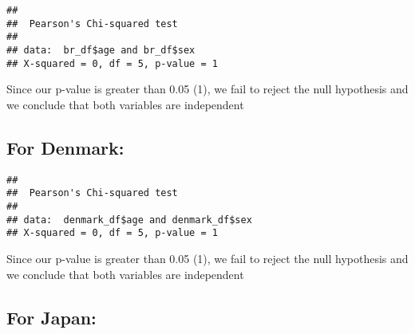 \documentclass[
]{article}
\newenvironment{Shaded}{\begin{snugshade}}{\end{snugshade}}
\newcommand{\FunctionTok}[1]{\textcolor[rgb]{0.00,0.00,0.00}{#1}}
\newcommand{\NormalTok}[1]{#1}
\newcommand{\SpecialCharTok}[1]{\textcolor[rgb]{0.00,0.00,0.00}{#1}}
\begin{document}
\begin{Shaded}
\end{Shaded}

\begin{verbatim}
## 
##  Pearson's Chi-squared test
## 
## data:  br_df$age and br_df$sex
## X-squared = 0, df = 5, p-value = 1
\end{verbatim}

Since our p-value is greater than 0.05 (1), we fail to reject the null
hypothesis and we conclude that both variables are independent

\hypertarget{for-denmark-2}{%
\subsection{For Denmark:}\label{for-denmark-2}}

\begin{Shaded}
\end{Shaded}

\begin{verbatim}
## 
##  Pearson's Chi-squared test
## 
## data:  denmark_df$age and denmark_df$sex
## X-squared = 0, df = 5, p-value = 1
\end{verbatim}

Since our p-value is greater than 0.05 (1), we fail to reject the null
hypothesis and we conclude that both variables are independent

\hypertarget{for-japan-2}{%
\subsection{For Japan:}\label{for-japan-2}}

\begin{Shaded}
\end{Shaded}
\end{document}
